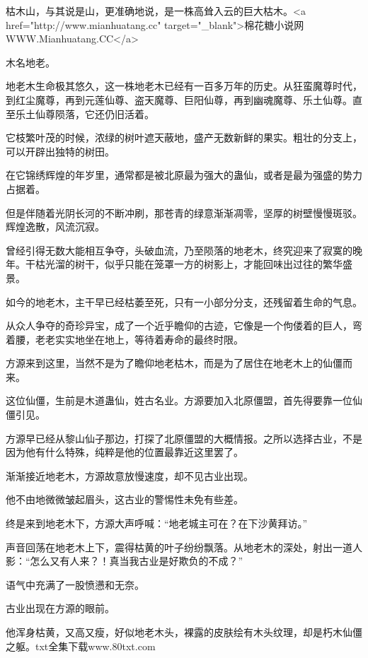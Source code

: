 
\begin{this_body}

枯木山，与其说是山，更准确地说，是一株高耸入云的巨大枯木。<a href="http://www.mianhuatang.cc" target="\_blank">棉花糖小说网WWW.Mianhuatang.CC</a>

木名地老。

地老木生命极其悠久，这一株地老木已经有一百多万年的历史。从狂蛮魔尊时代，到红尘魔尊，再到元莲仙尊、盗天魔尊、巨阳仙尊，再到幽魂魔尊、乐土仙尊。直至乐土仙尊陨落，它还仍旧活着。

它枝繁叶茂的时候，浓绿的树叶遮天蔽地，盛产无数新鲜的果实。粗壮的分支上，可以开辟出独特的树田。

在它锦绣辉煌的年岁里，通常都是被北原最为强大的蛊仙，或者是最为强盛的势力占据着。

但是伴随着光阴长河的不断冲刷，那苍青的绿意渐渐凋零，坚厚的树壁慢慢斑驳。辉煌逸散，风流沉寂。

曾经引得无数大能相互争夺，头破血流，乃至陨落的地老木，终究迎来了寂寞的晚年。干枯光溜的树干，似乎只能在笼罩一方的树影上，才能回味出过往的繁华盛景。

如今的地老木，主干早已经枯萎至死，只有一小部分分支，还残留着生命的气息。

从众人争夺的奇珍异宝，成了一个近乎瞻仰的古迹，它像是一个佝偻着的巨人，弯着腰，老老实实地坐在地上，等待着寿命的最终时限。

方源来到这里，当然不是为了瞻仰地老枯木，而是为了居住在地老木上的仙僵而来。

这位仙僵，生前是木道蛊仙，姓古名业。方源要加入北原僵盟，首先得要靠一位仙僵引见。

方源早已经从黎山仙子那边，打探了北原僵盟的大概情报。之所以选择古业，不是因为他有什么特殊，纯粹是他的位置最靠近这里罢了。

渐渐接近地老木，方源故意放慢速度，却不见古业出现。

他不由地微微皱起眉头，这古业的警惕性未免有些差。

终是来到地老木下，方源大声呼喊：“地老城主可在？在下沙黄拜访。”

声音回荡在地老木上下，震得枯黄的叶子纷纷飘落。从地老木的深处，射出一道人影：“怎么又有人来？！真当我古业是好欺负的不成？”

语气中充满了一股愤懑和无奈。

古业出现在方源的眼前。

他浑身枯黄，又高又瘦，好似地老木头，裸露的皮肤绘有木头纹理，却是朽木仙僵之躯。txt全集下载www.80txt.com


\end{this_body}
